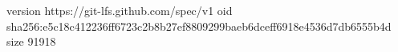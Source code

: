 version https://git-lfs.github.com/spec/v1
oid sha256:e5c18c412236ff6723c2b8b27ef8809299baeb6dceff6918e4536d7db6555b4d
size 91918
